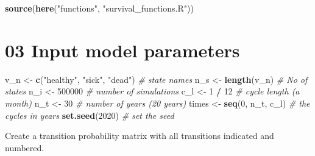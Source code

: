 \documentclass[
]{article}
\newenvironment{Shaded}{\begin{snugshade}}{\end{snugshade}}
\newcommand{\CommentTok}[1]{\textcolor[rgb]{0.56,0.35,0.01}{\textit{#1}}}
\newcommand{\DecValTok}[1]{\textcolor[rgb]{0.00,0.00,0.81}{#1}}
\newcommand{\KeywordTok}[1]{\textcolor[rgb]{0.13,0.29,0.53}{\textbf{#1}}}
\newcommand{\NormalTok}[1]{#1}
\newcommand{\OperatorTok}[1]{\textcolor[rgb]{0.81,0.36,0.00}{\textbf{#1}}}
\newcommand{\StringTok}[1]{\textcolor[rgb]{0.31,0.60,0.02}{#1}}
\begin{document}
\begin{Shaded}
\begin{Highlighting}[]
\KeywordTok{source}\NormalTok{(}\KeywordTok{here}\NormalTok{(}\StringTok{"functions"}\NormalTok{, }\StringTok{"survival_functions.R"}\NormalTok{))}
\end{Highlighting}
\end{Shaded}

\hypertarget{input-model-parameters}{%
\section{03 Input model parameters}\label{input-model-parameters}}

\begin{Shaded}
\begin{Highlighting}[]
\NormalTok{v_n       <-}\StringTok{ }\KeywordTok{c}\NormalTok{(}\StringTok{"healthy"}\NormalTok{, }\StringTok{"sick"}\NormalTok{, }\StringTok{"dead"}\NormalTok{)  }\CommentTok{# state names}
\NormalTok{n_s       <-}\StringTok{ }\KeywordTok{length}\NormalTok{(v_n)                   }\CommentTok{# No of states }
\NormalTok{n_i       <-}\StringTok{ }\DecValTok{500000}                          \CommentTok{# number of simulations }
\NormalTok{c_l       <-}\StringTok{ }\DecValTok{1} \OperatorTok{/}\StringTok{ }\DecValTok{12}                        \CommentTok{# cycle length (a month)}
\NormalTok{n_t       <-}\StringTok{ }\DecValTok{30}                            \CommentTok{# number of years (20 years)}
\NormalTok{times     <-}\StringTok{ }\KeywordTok{seq}\NormalTok{(}\DecValTok{0}\NormalTok{, n_t, c_l)              }\CommentTok{# the cycles in years}
\KeywordTok{set.seed}\NormalTok{(}\DecValTok{2020}\NormalTok{)                             }\CommentTok{# set the seed}
\end{Highlighting}
\end{Shaded}

Create a transition probability matrix with all transitions indicated
and numbered.
\end{document}
